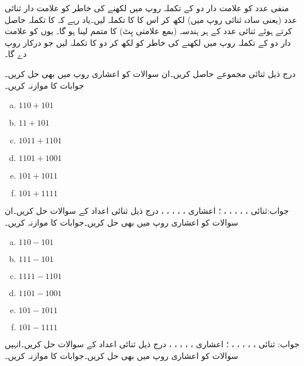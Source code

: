 منفی عدد  کو علامت دار دو کے تکملہ روپ میں لکھنے کی خاطر  کو علامت دار ثنائی عدد (یعنی سادہ ثنائی روپ میں) لکھ کر اس کا  کا تکملہ لیں۔یاد رہے کہ  کا تکملہ حاصل کرتے ہوئے ثنائی عدد کے ہر ہندسہ (بمع علامتی بِٹ) کا متمم لینا ہو گا۔ یوں  کو علامت دار دو کے تکملہ روپ میں لکھنے کی خاطر  کو  لکھ کر دو کا تکملہ لیں جو درکار روپ  دے گا۔

درج ذیل ثنائی مجموعے حاصل کریں۔ان سوالات کو اعشاری روپ میں بھی حل کریں۔جوابات کا موازنہ کریں۔
\begin{multicols}{4}
\begin{enumerate}[a.]

\item  
 \(110+101\)  
\item 
 \(11+101\) 

\item  
 \(1011+1101\)  
\item 
 \(1101+1001\)   

\item  
 \(101+1011\)  
\item 
 \(101+1111\)  
\end{enumerate}
\end{multicols}
جواب:ثنائی ، ، ، ، ، ؛ 
اعشاری   ، ، ، ، ، 
درج ذیل ثنائی اعداد کے سوالات حل کریں۔ان سوالات کو اعشاری روپ میں بھی حل کریں۔جوابات کا موازنہ کریں۔
\begin{multicols}{4}
\begin{enumerate}[a.]

\item  
 \(110-101\)  
\item 
 \(111-101\) 

\item  
 \(1111-1101\)  
\item 
 \(1101-1001\)   

\item  
 \(101-1011\)  
\item 
 \(101-1111\)
\end{enumerate}
\end{multicols}
جواب: ثنائی  ، ، ،  ، ، ؛
 اعشاری  ، ، ، ،  ، 
درج ذیل ثنائی اعداد کے سوالات حل کریں۔انہیں سوالات کو اعشاری روپ میں بھی حل کریں۔جوابات کا موازنہ کریں۔

